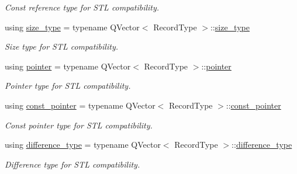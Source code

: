 \begin{DoxyCompactItemize}
\begin{DoxyCompactList}\small\item\em Const reference type for S\+TL compatibility. \end{DoxyCompactList}\item 
using \hyperlink{class_mdt_1_1_plain_text_1_1_record_list_template_ac5b714fe2e3a5361f343ee1b9a49546b}{size\+\_\+type} = typename Q\+Vector$<$ Record\+Type $>$\+::\hyperlink{class_mdt_1_1_plain_text_1_1_record_list_template_ac5b714fe2e3a5361f343ee1b9a49546b}{size\+\_\+type}
\begin{DoxyCompactList}\small\item\em Size type for S\+TL compatibility. \end{DoxyCompactList}\item 
using \hyperlink{class_mdt_1_1_plain_text_1_1_record_list_template_a95aa000e23da3c55a41e4d9e81ffedbb}{pointer} = typename Q\+Vector$<$ Record\+Type $>$\+::\hyperlink{class_mdt_1_1_plain_text_1_1_record_list_template_a95aa000e23da3c55a41e4d9e81ffedbb}{pointer}
\begin{DoxyCompactList}\small\item\em Pointer type for S\+TL compatibility. \end{DoxyCompactList}\item 
using \hyperlink{class_mdt_1_1_plain_text_1_1_record_list_template_a4f7a4908afbe8ec86a57c2a9922ceed3}{const\+\_\+pointer} = typename Q\+Vector$<$ Record\+Type $>$\+::\hyperlink{class_mdt_1_1_plain_text_1_1_record_list_template_a4f7a4908afbe8ec86a57c2a9922ceed3}{const\+\_\+pointer}
\begin{DoxyCompactList}\small\item\em Const pointer type for S\+TL compatibility. \end{DoxyCompactList}\item 
using \hyperlink{class_mdt_1_1_plain_text_1_1_record_list_template_a93665d213efef18c64b3470164f8e57d}{difference\+\_\+type} = typename Q\+Vector$<$ Record\+Type $>$\+::\hyperlink{class_mdt_1_1_plain_text_1_1_record_list_template_a93665d213efef18c64b3470164f8e57d}{difference\+\_\+type}
\begin{DoxyCompactList}\small\item\em Difference type for S\+TL compatibility. \end{DoxyCompactList}\end{DoxyCompactItemize}
